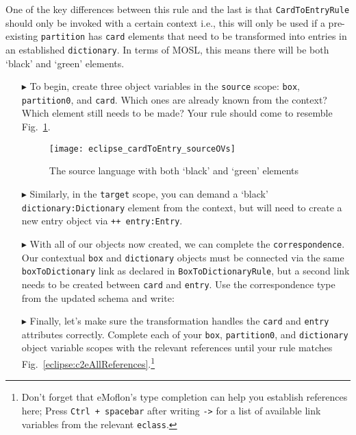 One of the key differences between this rule and the last is that \texttt{Card\-To\-Ent\-ry\-Rule} should only be invoked with a certain context i.e., this will
only be used if a pre-existing \texttt{partition} has \texttt{card} elements that need to be transformed into entries in an established \texttt{dictionary}. In
terms of MOSL, this means there will be both `black' and `green' elements.

\begin{itemize}

\item[$\blacktriangleright$] To begin, create three object variables in the \texttt{source} scope: \texttt{box}, \texttt{partition0}, and \texttt{card}. Which
ones are already known from the context? Which element still needs to be made? Your rule should come to resemble Fig.~\ref{eclipse:c2eRuleSource}.

\begin{figure}[htbp]
\begin{center}
  \texttt{[image: eclipse\_cardToEntry\_sourceOVs]}
  \caption{The source language with both `black' and `green' elements}
  \label{eclipse:c2eRuleSource}
\end{center}
\end{figure}

\item[$\blacktriangleright$] Similarly, in the \texttt{target} scope, you can demand a `black' \texttt{dic\-tion\-ary:Dic\-tion\-ary} element from the context,
but will need to create a new entry object via \texttt{++ entry:Entry}. 

\vspace{0.5cm}

\item[$\blacktriangleright$] With all of our objects now created, we can complete the \texttt{cor\-res\-pon\-dence}. Our contextual \texttt{box} and
\texttt{dictionary} objects must be connected via the same \texttt{boxToDictionary} link as declared in \texttt{Box\-To\-Dict\-ion\-ary\-Rule}, but a second
link needs to be created between \texttt{card} and \texttt{entry}. Use the correspondence type from the updated schema and write: 

\vspace{0.5cm}

\item[$\blacktriangleright$] Finally, let's make sure the transformation handles the \texttt{card} and \texttt{entry} attributes correctly. Complete each of
your \texttt{box}, \texttt{partition0}, and \texttt{dictionary} object variable scopes with the relevant references until your rule matches
Fig.~\ref{eclipse:c2eAllReferences}.\footnote{Don't forget that eMoflon's type completion can help you establish references here; Press \texttt{Ctrl + spacebar}
after writing \texttt{->} for a list of available link variables from the relevant \texttt{eclass}.}


\end{itemize}
